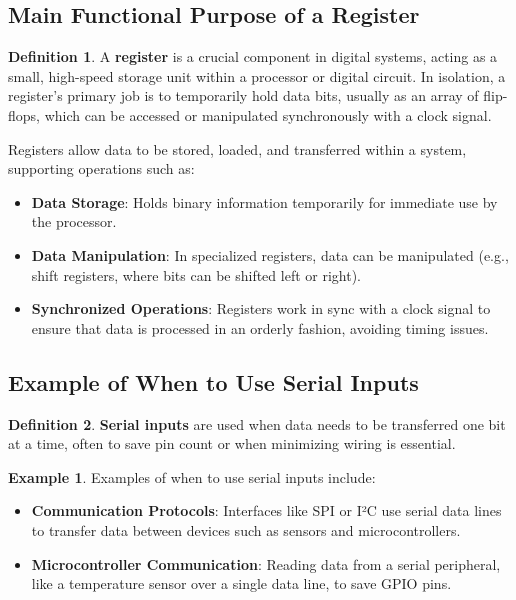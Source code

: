 \documentclass[12pt]{article}
\theoremstyle{definition}
\newtheorem{definition}{Definition}
\newtheorem{example}{Example}
\begin{document}
\subsection{Main Functional Purpose of a Register}

\begin{definition}
	A \textbf{register} is a crucial component in digital systems, acting as a small, high-speed storage unit within a processor or digital circuit. In isolation, a register’s primary job is to temporarily hold data bits, usually as an array of flip-flops, which can be accessed or manipulated synchronously with a clock signal.
\end{definition}

Registers allow data to be stored, loaded, and transferred within a system, supporting operations such as:
\begin{itemize}
	\item \textbf{Data Storage}: Holds binary information temporarily for immediate use by the processor.
	\item \textbf{Data Manipulation}: In specialized registers, data can be manipulated (e.g., shift registers, where bits can be shifted left or right).
	\item \textbf{Synchronized Operations}: Registers work in sync with a clock signal to ensure that data is processed in an orderly fashion, avoiding timing issues.
\end{itemize}

\subsection{Example of When to Use Serial Inputs}

\begin{definition}
	\textbf{Serial inputs} are used when data needs to be transferred one bit at a time, often to save pin count or when minimizing wiring is essential.
\end{definition}

\begin{example}
	Examples of when to use serial inputs include:
	\begin{itemize}
		\item \textbf{Communication Protocols}: Interfaces like SPI or I²C use serial data lines to transfer data between devices such as sensors and microcontrollers.
		\item \textbf{Microcontroller Communication}: Reading data from a serial peripheral, like a temperature sensor over a single data line, to save GPIO pins.
	\end{itemize}
\end{example}
\end{document}
